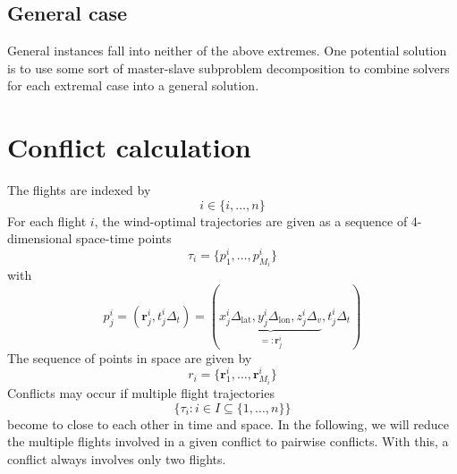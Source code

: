 \documentclass{article}
\begin{document}
\subsection{General case}
General instances fall into neither of the above extremes.
One potential solution is to use some sort of master-slave subproblem decomposition to combine solvers for each extremal case into a general solution.

\section{Conflict calculation}
The flights are indexed by
\begin{equation*}
    i \in \{i, \dots, n\}
\end{equation*}
For each flight $i$, the wind-optimal trajectories are given as a sequence of 4-dimensional space-time points
\begin{equation*}
    \tau_i = \{p^i_1, \dots, p^i_{M_i}\}
\end{equation*}
with
\begin{equation*}
    p^i_j = (\mathbf{r}^i_j, t^i_j \Delta_t) = \left( \underbrace{x^i_j \Delta_\text{lat}, y^i_j \Delta_\text{lon}, z^i_j \Delta_v}_{=:\mathbf{r}^i_j}, t^i_j \Delta_t\right)
\end{equation*}
The sequence of points in space are given by
\begin{equation*}
    r_i = \{\mathbf{r}^i_1, \dots, \mathbf{r}^i_{M_i}\}
\end{equation*}
Conflicts may occur if multiple flight trajectories
\begin{equation*}
    \{\tau_i : i \in I \subseteq \{1, \dots, n\}\}
\end{equation*}
become to close to each other in time and space.
In the following, we will reduce the multiple flights involved in a given conflict to pairwise conflicts.
With this, a conflict always involves only two flights.
\end{document}
